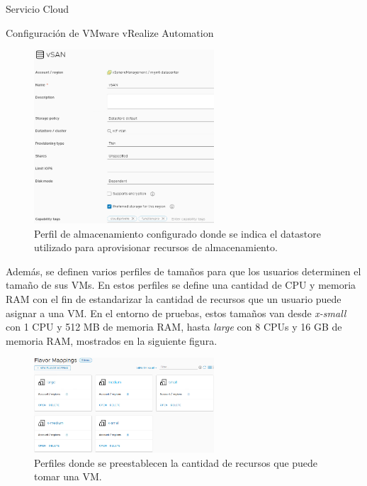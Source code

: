 \begin{subsection}{Servicio Cloud}
\begin{subsubsection}{Configuración de VMware vRealize Automation}
        \begin{figure}[h]
            \centering
            \includegraphics[width=0.6\textwidth]{imaxes/pruebaconcepto/vrealize/datastore-policy.png}
            \caption{Perfil de almacenamiento configurado donde se indica el datastore utilizado para aprovisionar recursos de almacenamiento.}
            \label{fig:storage-policy}
        \end{figure}
        \FloatBarrier
        Además, se definen varios perfiles de tamaños para que los usuarios determinen el tamaño de sus VMs. En estos perfiles se define una cantidad de CPU y memoria RAM con el fin de estandarizar la cantidad de recursos que un usuario puede asignar a una VM. En el entorno de pruebas, estos tamaños van desde \textit{x-small} con 1 CPU y 512 MB de memoria RAM, hasta \textit{large} con 8 CPUs y 16 GB de memoria RAM, mostrados en la siguiente figura.
        \begin{figure}[h]
            \centering
            \includegraphics[width=0.6\textwidth]{imaxes/pruebaconcepto/vrealize/flavor-mapping.png}
            \caption{Perfiles donde se preestablecen la cantidad de recursos que puede tomar una VM.}
            \label{fig:falvor-mapping}
        \end{figure}
        \FloatBarrier

\end{subsubsection}
\end{subsection}

